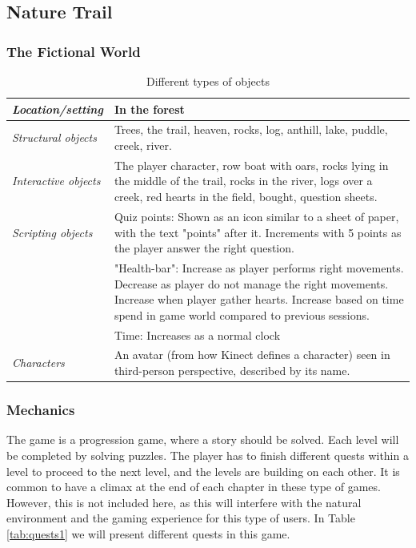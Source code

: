 \subsection{Nature Trail}

\subsubsection{The Fictional World} 

\begin{table} [H]
\centering
    \begin{tabular}{|p{}|p{}|}
       \hline
        \emph{Location/setting} & In the forest  \\ \hline
       \emph{Structural objects} & Trees, the trail, heaven, rocks, log, anthill, lake, puddle, creek, river.  \\ \hline
       \emph{Interactive objects} & The player character, row boat with oars, rocks lying in the middle of the trail, rocks in the river, logs over a creek, red hearts in the field, bought, question sheets. \\ \hline
	   \emph{Scripting objects} & Quiz points: Shown as an icon similar to a sheet of paper, with the text "points" after it. Increments with 5 points as the player answer the right question.\\ \hline
	     & "Health-bar": Increase as player performs right movements. Decrease as player do not manage the right movements. Increase when player gather hearts. Increase based on time spend in game world compared to previous sessions. 
	      \\ \hline
	       & Time: Increases as a normal clock \\ \hline
	       \emph{Characters} & An avatar (from how Kinect defines a character) seen in third-person perspective, described by its name. \\ \hline
    \end{tabular}
    \caption[Various objects in the "Nature Trail"]{Different types of objects}
    \label{tab:objects1}
\end{table}  

\subsubsection{Mechanics} 

The game is a progression game, where a story should be solved. Each level will be completed by solving puzzles. The player has to finish different quests within a level to proceed to the next level, and the levels are building on each other. It is common to have a climax at the end of each chapter in these type of games. However, this is not included here, as this will interfere with the natural environment and the gaming experience for this type of users. In Table \ref{tab:quests1} we will present different quests in this game. 
  
